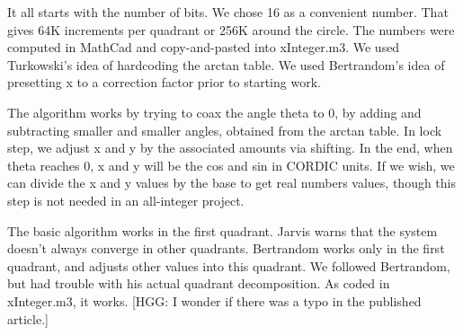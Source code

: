 It all starts with the number of bits.  We chose 16 as a convenient
number.  That gives 64K increments per quadrant or 256K around the 
circle.  The numbers were computed in MathCad and copy-and-pasted
into xInteger.m3. We used Turkowski's idea of hardcoding the
arctan table.  We used Bertrandom's idea of presetting x to a correction
factor prior to starting work.

The algorithm works by trying to coax the angle theta to 0, by
adding and subtracting smaller and smaller angles, obtained from the
arctan table. In lock step, we adjust x and y by the associated amounts
via shifting.  In the end, when theta reaches 0, x and y will be the 
cos and sin in CORDIC units.  If we wish, we can divide the x and y values
by the base to get real numbers values, though this step is not
needed in an all-integer project. 

The basic algorithm works in the first quadrant.  Jarvis warns that 
the system doesn't always converge in other quadrants.  Bertrandom 
works only in the first quadrant, and adjusts other values into
this quadrant.  We followed Bertrandom, but had trouble with his actual
quadrant decomposition.  As coded in xInteger.m3, it works.  [HGG:
I wonder if there was a typo in the published article.]
